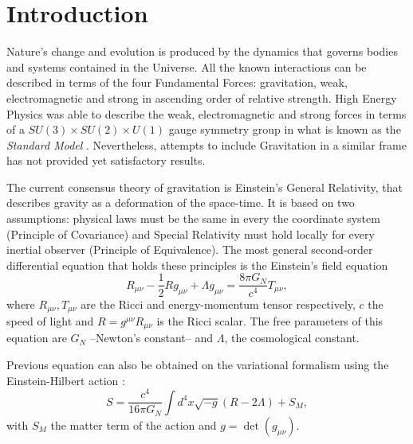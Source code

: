 \chapter{Introduction}
\label{ch:introduction}
Nature's change and evolution is produced by the dynamics that governs bodies and systems contained in the Universe. All the known interactions can be described in terms of the four Fundamental Forces: gravitation, weak, electromagnetic and strong in ascending order of relative strength. High Energy Physics was able to describe the weak, electromagnetic and strong forces in terms of a $SU(3)\times SU(2)\times U(1)$ gauge symmetry group in what is known as the {\it Standard Model} \cite{halzen1984quarks,peskin1995introduction,weinberg1995quantum,weinberg1996quantum,2000hep.ph....1283N}. Nevertheless, attempts to include Gravitation in a similar frame has not provided yet satisfactory results.
\newline

The current consensus theory of gravitation is Einstein's General Relativity, that describes gravity as a deformation of the space-time. It is based on two assumptions: physical laws must be the same in every the coordinate system (Principle of Covariance) and Special Relativity must hold locally for every inertial observer (Principle of Equivalence). The most general second-order differential equation that holds these principles is the Einstein's field equation \cite{ANDP:ANDP19163540702,1916AnP...354..769E,1917SPAW.......142E,2001LRR.....4....1C}
\begin{equation}
R_{\mu\nu}-\frac{1}{2}Rg_{\mu\nu} + \Lambda g_{\mu\nu} = \frac{8\pi G_N}{c^4}T_{\mu\nu},
\label{eq:einsteinbare}
\end{equation}
where $R_{\mu\nu},T_{\mu\nu}$ are the Ricci and energy-momentum tensor respectively, $c$ the speed of light and $R=g^{\mu\nu}R_{\mu\nu}$ is the Ricci scalar. The free parameters of this equation are $G_N$ --Newton's constant-- and $\Lambda$, the cosmological constant.
\newline

Previous equation can also be obtained on the variational formalism using the Einstein-Hilbert action \cite{Hilbert:1915tx}:
\begin{equation}
S = \frac{c^4}{16\pi G_N}\int d^4x\sqrt{-g}(R-2\Lambda)+S_M,
\label{eq:ehaction}
\end{equation}
with $S_M$ the matter term of the action and $g=\det(g_{\mu\nu})$.

